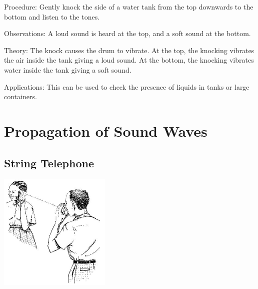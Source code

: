 \begin{multicols}{2}
\begin{description*}
\item[Procedure:]{Gently knock the side of a water tank from the top downwards to the bottom and listen to the tones.}
\item[Observations:]{A loud sound is heard at the top, and a soft sound at the bottom.}
\item[Theory:]{The knock causes the drum to vibrate. At the top, the knocking vibrates the air inside the tank giving a loud sound. At the bottom, the knocking vibrates water inside the tank giving a soft sound.}
\item[Applications:]{This can be used to check the presence of liquids in tanks or large containers.}
\end{description*}


\section*{Propagation of Sound Waves}


\subsection{String Telephone}

\begin{center}
\includegraphics[width=0.4\textwidth]{./img/source/wave-motion.jpg}
\end{center}


\end{multicols}

